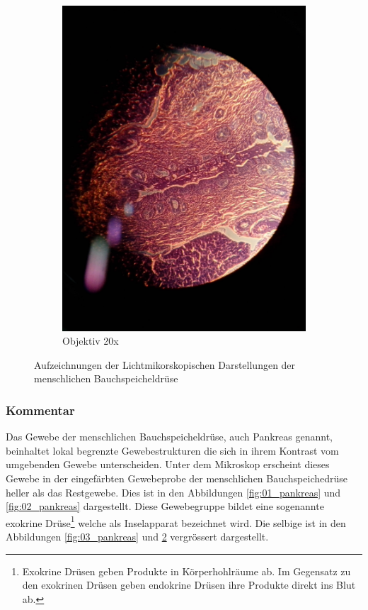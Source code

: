 \begin{figure}[h!]
\begin{subfigure}[b]{0.45\textwidth}
		\includegraphics[angle=270, width=1\textwidth]{../images/04_pankreas.jpg}
		\caption{Objektiv 20x}
		\label{fig:04_pankreas}
	\end{subfigure}
	\caption{Aufzeichnungen der Lichtmikorskopischen Darstellungen der
		menschlichen Bauchspeicheldrüse}
\end{figure}

\subsubsection{Kommentar}
Das Gewebe der menschlichen Bauchspeicheldrüse, auch Pankreas genannt,
beinhaltet lokal begrenzte Gewebestrukturen die sich in ihrem Kontrast vom
umgebenden Gewebe unterscheiden. Unter dem Mikroskop erscheint dieses Gewebe
in der eingefärbten Gewebeprobe der menschlichen Bauchspeichedrüse heller als
das Restgewebe. Dies ist in den Abbildungen \ref{fig:01_pankreas} und
\ref{fig:02_pankreas} dargestellt. Diese Gewebegruppe bildet eine sogenannte
exokrine Drüse\footnote{Exokrine Drüsen geben Produkte in Körperhohlräume ab.
Im Gegensatz zu den exokrinen Drüsen geben endokrine Drüsen ihre Produkte
direkt ins Blut ab.} welche als Inselapparat bezeichnet wird. Die selbige ist
in den Abbildungen \ref{fig:03_pankreas} und \ref{fig:04_pankreas} vergrössert
dargestellt.

